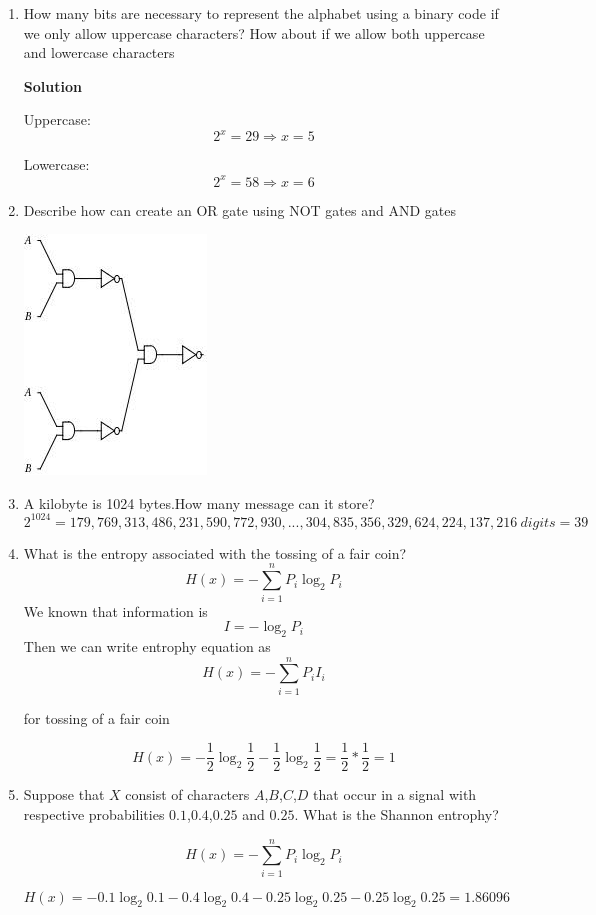 \documentclass{article}
\begin{document}
\begin{enumerate}
\item How many bits are necessary to represent the alphabet using a binary code if we only allow uppercase characters? How about if we allow both uppercase and lowercase characters

\textbf{Solution}

Uppercase:
\[2^x = 29 \Rightarrow x=5\]

Lowercase:
\[2^x = 58 \Rightarrow x=6\]

\item Describe how can create an OR gate using NOT gates and AND gates
\begin{center}
\includegraphics[scale=1]{orwithand.jpg} 
\end{center}


\item A kilobyte is 1024 bytes.How many message can it store?
\[2^{1024} = 179,769,313,486,231,590,772,930,...,304,835,356,329,624,224,137,216 \ digits=39\]
\item What is the entropy associated with the tossing of a fair coin?
\[ H(x) =-\sum_{i=1}^{n} P_{i} \log_{2} P_{i} \] 
We known that information is
\[I = - \log_{2} P_{i}\] 
Then we can write entrophy equation as
\[ H(x) =-\sum_{i=1}^{n} P_{i} I_{i} \]

for tossing of a fair coin

\[ H(x) =- \frac{1}{2} \log_{2} \frac{1}{2} - \frac{1}{2} \log_{2} \frac{1}{2}  = \frac{1}{2} * \frac{1}{2}= 1\] 

\item Suppose that $X$ consist of characters $A$,$B$,$C$,$D$ that occur in a signal with respective probabilities $0.1$,$0.4$,$0.25$ and $0.25$. What is the Shannon entrophy?

\[ H(x) =-\sum_{i=1}^{n} P_{i} \log_{2} P_{i} \] 

\[ H(x) =- 0.1 \log_{2} 0.1 - 0.4 \log_{2}  0.4 - 0.25 \log_{2} 0.25 - 0.25 \log_{2} 0.25  = 1.86096\] 


\end{enumerate}
\end{document}
